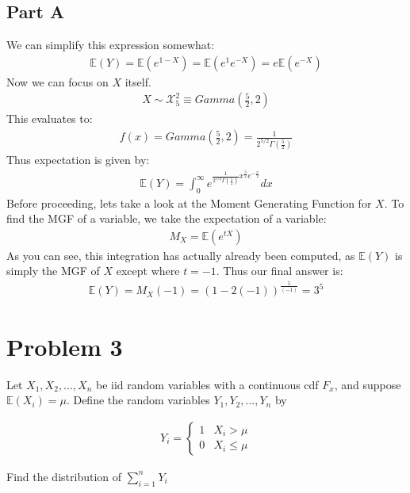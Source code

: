 \documentclass{article}
\begin{document}
\subsection*{Part A}
We can simplify this expression somewhat:
\begin{align*}
\mathbb{E}(Y) = \mathbb{E}(e^{1-X}) = \mathbb{E}(e^{1}e^{-X}) = e \mathbb{E}(e^{-X})
\end{align*}
Now we can focus on $X$ itself. 
\begin{align*}
X \sim \mathcal{X}^2_{5} \equiv Gamma(\tfrac{5}{2},2)
\end{align*}
This evaluates to:
\begin{align*}
f(x) = Gamma(\tfrac{5}{2},2) = \frac{1}{2^{5/2}\Gamma(\tfrac{5}{2})}
\end{align*}
Thus expectation is given by:
\begin{align*}
\mathbb{E}(Y) = \int_{0}^{\infty} e^{\frac{1}{2^{5/2}\Gamma(\tfrac{5}{2})} x^{\tfrac{3}{2}} e^{-\tfrac{x}{2}}} dx
\end{align*}
Before proceeding, lets take a look at the Moment Generating Function for $X$. To find the MGF of a variable, we take the expectation of a variable:
\begin{align*}
M_X = \mathbb{E}(e^{tX})
\end{align*}
As you can see, this integration has actually already been computed, as $\mathbb{E}(Y)$ is simply the MGF of $X$ except where $t=-1$. Thus our final answer is:
\begin{align*}
\boxed{ \mathbb{E}(Y) = M_X(-1) = (1-2(-1))^{\tfrac{5}{(-1)}} = 3^5 }
\end{align*}
    
\clearpage
\section*{Problem 3}
Let $X_1, X_2,..., X_n$ be iid random variables with a continuous cdf $F_x$, and suppose
$\mathbb{E}(X_i)=\mu$. Define the random variables $Y_1, Y_2,..., Y_n$ by 

\begin{align*}
Y_i = 
\begin{cases} 
      1 & X_i > \mu \\
      0 & X_i \leq \mu  
   \end{cases}
\end{align*}

Find the distribution of $\sum^{n}_{i=1} Y_i$
\end{document}
